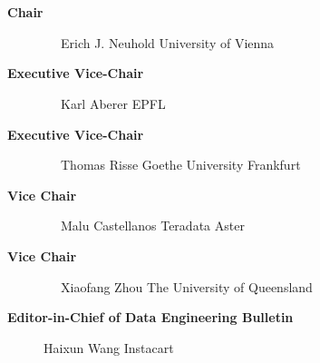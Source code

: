 \documentclass[10pt,twocolumn]{article}
\begin{document}
\begin{description}

\item[{\bf Chair}] 
\verb-  -                     	\newline
Erich J. Neuhold  \newline
University of Vienna  \newline
\vspace{-.4cm}

\item[{\bf Executive Vice-Chair}] 
\verb-  -                      \newline
Karl Aberer \newline
EPFL \newline
\vspace{-.4cm}

\item[{\bf Executive Vice-Chair}] 
\verb-  -                      \newline
Thomas Risse \newline
Goethe University Frankfurt \newline
\vspace{-.4cm}

\item[{\bf Vice Chair}] 
\verb-  -                      \newline
Malu Castellanos \newline
Teradata Aster \newline
\vspace{-.4cm}

\item[{\bf Vice Chair}] 
\verb-  -                      \newline
Xiaofang Zhou \newline
The University of Queensland \newline
\vspace{-.4cm}

\item[{\bf Editor-in-Chief of Data Engineering Bulletin}] 
Haixun Wang \newline
Instacart\newline
\vspace{-.4cm}


\end{description}
\end{document}
